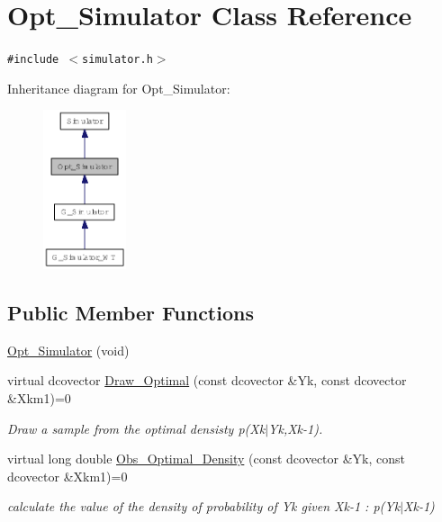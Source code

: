 \hypertarget{class_opt___simulator}{
\section{Opt\_\-Simulator Class Reference}
\label{class_opt___simulator}
}
{\tt \#include $<$simulator.h$>$}

Inheritance diagram for Opt\_\-Simulator:\nopagebreak
\begin{figure}[H]
\begin{center}
\leavevmode
\includegraphics[width=69pt]{class_opt___simulator__inherit__graph}
\end{center}
\end{figure}
\subsection*{Public Member Functions}
\begin{CompactItemize}
\item 
\hyperlink{class_opt___simulator_9c18baf105bd365af92a933e1a068c3e}{Opt\_\-Simulator} (void)
\item 
virtual dcovector \hyperlink{class_opt___simulator_75490247df4dfa14eb7b2d8d394675dd}{Draw\_\-Optimal} (const dcovector \&Yk, const dcovector \&Xkm1)=0
\begin{CompactList}\small\item\em Draw a sample from the optimal densisty p(Xk$|$Yk,Xk-1). \item\end{CompactList}\item 
virtual long double \hyperlink{class_opt___simulator_e72d4709998087317635a94c709d71ba}{Obs\_\-Optimal\_\-Density} (const dcovector \&Yk, const dcovector \&Xkm1)=0
\begin{CompactList}\small\item\em calculate the value of the density of probability of Yk given Xk-1 : p(Yk$|$Xk-1) \item\end{CompactList}\end{CompactItemize}


